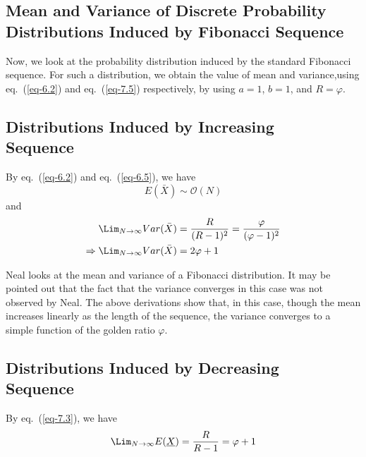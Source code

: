 \begin{multicols}{2}
\section{Mean and Variance of Discrete Probability Distributions Induced by Fibonacci Sequence}\label{section-8}

Now, we look at the probability distribution induced by the standard Fibonacci sequence. For such a distribution, we obtain the value of mean and variance,using eq.~(\ref{eq-6.2}) and eq.~(\ref{eq-7.5}) respectively, by using $a = 1 $, $b = 1$, and $R = \varphi$.

\subsection{Distributions Induced by Increasing\\ Sequence}\label{subsection-8.1}

By eq.~(\ref{eq-6.2}) and eq.~(\ref{eq-6.5}), we have 
$$
\nonumber E(\bar{X})  \sim \mathcal{O}(N)
$$
and 
\begin{align}
\Lim_{N \rightarrow \infty}Var(\bar{X}) &= \frac{R}{(R-1)^2} = \frac{\varphi}{(\varphi-1)^2}\nonumber\\
\Rightarrow \Lim_{N \rightarrow \infty}Var(\bar{X}) &= 2\varphi+1\label{eq-8.1}
\end{align}

\vspace{-.3cm}

Neal \cite{art1-key01} looks at the mean and variance of a Fibonacci distribution. It may be pointed out that the fact that the variance converges in this case was not observed by Neal. The above derivations show that, in this case, though the mean increases linearly as the length of the sequence, the variance converges to a simple function of the golden ratio $\varphi$.

\vspace{-.5cm}

\subsection{Distributions Induced by Decreasing\\ Sequence}\label{subsection-8.2}
By eq.~(\ref{eq-7.3}), we have
\begin{equation}
\nonumber \displaystyle{\Lim_{N \rightarrow \infty}}E(\underline{X}) =  \displaystyle{\frac{R}{R-1}} = \varphi + 1
 \end{equation}


\end{multicols}
